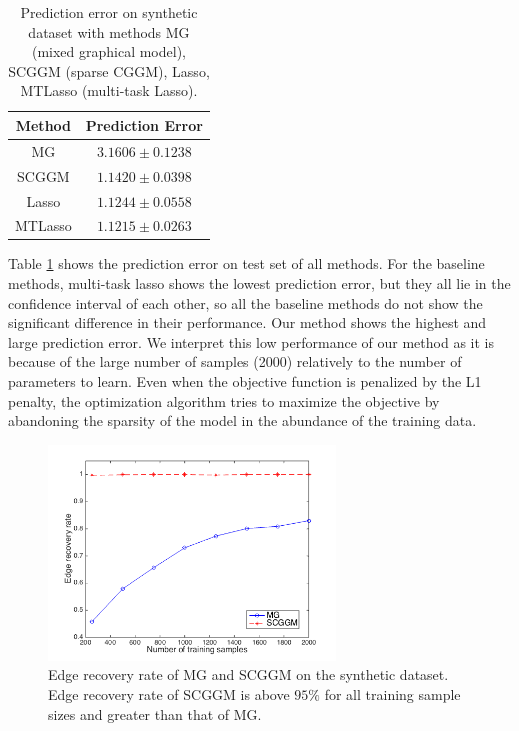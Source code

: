 \documentclass{article}
\begin{document}
\begin{table}
    \label{table:syn_pred_err}
    	\caption{Prediction error on synthetic dataset with methods MG (mixed graphical model), SCGGM (sparse CGGM), Lasso, MTLasso (multi-task Lasso).}
\begin{center}
    \begin{tabular}{| c | c |}
    \hline
    Method & Prediction Error \\
    \hline
    MG & $3.1606 \pm 0.1238$ \\
    SCGGM & $1.1420 \pm 0.0398$  \\
    Lasso & $1.1244 \pm 0.0558$  \\
    MTLasso & $1.1215 \pm 0.0263$ \\
    \hline 
    \end{tabular}
\end{center}
\end{table}
Table \ref{table:syn_pred_err} shows the prediction error on test set of all methods. For the baseline methods, multi-task lasso shows the lowest prediction error, but they all lie in the confidence interval of each other, so all the baseline methods do not show the significant difference in their performance. Our method shows the highest and large prediction error. We interpret this low performance of our method as it is because of the large number of samples (2000) relatively to the number of parameters to learn. Even when the objective function is penalized by the L1 penalty, the optimization algorithm tries to maximize the objective by abandoning the sparsity of the model in the abundance of the training data.

\begin{figure}[hb]
  \centering
  \label{fig:syn_edge_rec}
  \includegraphics[width=3in]{figure/figure1}
  \caption[] {Edge recovery rate of MG and SCGGM on the synthetic dataset. Edge recovery rate of SCGGM is above $95\%$ for all training sample sizes and greater than that of MG.}
\end{figure}
\end{document}

